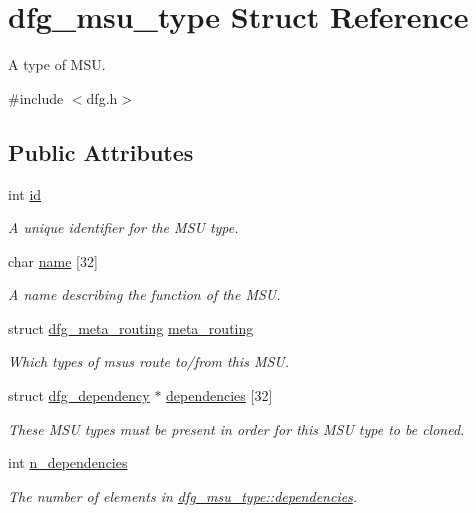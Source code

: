 \hypertarget{structdfg__msu__type}{\section{dfg\-\_\-msu\-\_\-type Struct Reference}
\label{structdfg__msu__type}
}


A type of M\-S\-U.  




{\ttfamily \#include $<$dfg.\-h$>$}

\subsection*{Public Attributes}
\begin{DoxyCompactItemize}
\item 
int \hyperlink{structdfg__msu__type_a25713ab319d35972ecb502b8c998d5c2}{id}
\begin{DoxyCompactList}\small\item\em A unique identifier for the M\-S\-U type. \end{DoxyCompactList}\item 
char \hyperlink{structdfg__msu__type_a59f34013c4d7464817de4fd3c9bebec9}{name} \mbox{[}32\mbox{]}
\begin{DoxyCompactList}\small\item\em A name describing the function of the M\-S\-U. \end{DoxyCompactList}\item 
struct \hyperlink{structdfg__meta__routing}{dfg\-\_\-meta\-\_\-routing} \hyperlink{structdfg__msu__type_ac9778638f0dc0bd6e0139f2181ea5f13}{meta\-\_\-routing}
\begin{DoxyCompactList}\small\item\em Which types of msus route to/from this M\-S\-U. \end{DoxyCompactList}\item 
struct \hyperlink{structdfg__dependency}{dfg\-\_\-dependency} $\ast$ \hyperlink{structdfg__msu__type_ae99af1194aeded6b89928e96dfb054d4}{dependencies} \mbox{[}32\mbox{]}
\begin{DoxyCompactList}\small\item\em These M\-S\-U types must be present in order for this M\-S\-U type to be cloned. \end{DoxyCompactList}\item 
int \hyperlink{structdfg__msu__type_a7415469cbf6b8a856375aa211c4732c2}{n\-\_\-dependencies}
\begin{DoxyCompactList}\small\item\em The number of elements in \hyperlink{structdfg__msu__type_ae99af1194aeded6b89928e96dfb054d4}{dfg\-\_\-msu\-\_\-type\-::dependencies}. \end{DoxyCompactList}\item 

\end{DoxyCompactItemize}
